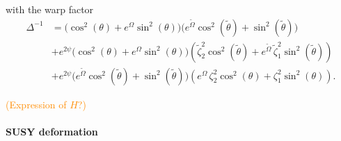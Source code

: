 \documentclass[a4paper, 11pt]{article}
\numberwithin{equation}{section}
\newcommand{\ts}[1]{\widetilde{#1}}
\newcommand{\+}{\oplus}
\newcommand{\CE}[1]{\textcolor{darkorange}{#1}}
\begin{document}
with the warp factor
\begin{equation}
	\begin{aligned}
	\Delta^{-1} &= \Big(\cos^{2}(\theta)+e^{\Omega}\sin^{2}(\theta)\Big)\Big(e^{\ts{\Omega}}\cos^{2}(\ts{\theta})+\sin^{2}(\ts{\theta})\Big)\\
	&+e^{2\psi}\Big(\cos^{2}(\theta)+e^{\Omega}\sin^{2}(\theta)\Big)\left(\ts{\zeta}_{2}^{2}\cos^{2}(\ts{\theta})+e^{\ts{\Omega}}\,\ts{\zeta}_{1}^{2}\sin^{2}(\ts{\theta})\right)\\
	&+e^{2\psi}\Big(e^{\ts{\Omega}}\cos^{2}(\ts{\theta})+\sin^{2}(\ts{\theta})\Big)\left(e^{\Omega}\,\zeta_{2}^{2}\cos^{2}(\theta)+\zeta_{1}^{2}\sin^{2}(\theta)\right).
	\end{aligned}
\end{equation}

\CE{(Expression of $H$?)}

\paragraph{SUSY deformation}

\end{document}
